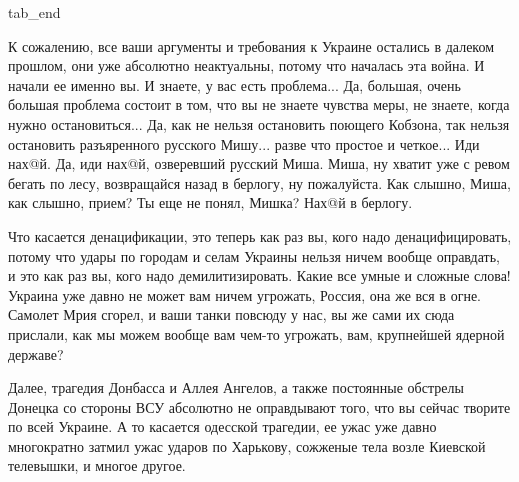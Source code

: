   tab_end
\fi

К сожалению, все ваши аргументы и требования к Украине остались в далеком
прошлом, они уже абсолютно неактуальны, потому что началась эта война. И начали
ее именно вы. И знаете, у вас есть проблема... Да, большая, очень большая
проблема состоит в том, что вы не знаете чувства меры, не знаете, когда нужно
остановиться... Да, как не нельзя остановить поющего Кобзона, так нельзя
остановить разъяренного русского Мишу...  разве что простое и четкое... Иди
нах@й. Да, иди нах@й, озверевший русский Миша. Миша, ну хватит уже с ревом
бегать по лесу, возвращайся назад в берлогу, ну пожалуйста. Как слышно, Миша,
как слышно, прием? Ты еще не понял, Мишка? Нах@й в берлогу.

Что касается денацификации, это теперь как раз вы, кого надо денацифицировать,
потому что удары по городам и селам Украины нельзя ничем вообще оправдать, и
это как раз вы, кого надо демилитизировать. Какие все умные и сложные слова!
Украина уже давно не может вам ничем угрожать, Россия, она же вся в огне.
Самолет Мрия сгорел, и ваши танки повсюду у нас, вы же сами их сюда прислали,
как мы можем вообще вам чем-то угрожать, вам, крупнейшей ядерной державе?

Далее, трагедия Донбасса и Аллея Ангелов, а также постоянные обстрелы Донецка
со стороны ВСУ абсолютно не оправдывают того, что вы сейчас творите по всей
Украине. А то касается одесской трагедии, ее ужас уже давно многократно затмил
ужас ударов по Харькову, сожженые тела возле Киевской телевышки, и многое
другое.
